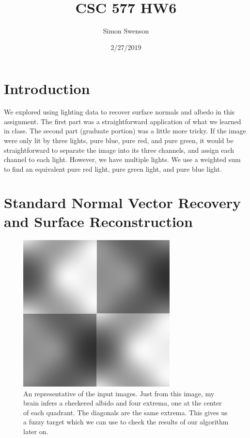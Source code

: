 \documentclass{article}
\title{CSC 577 HW6}
\date{2/27/2019}
\author{Simon Swenson}
\begin{document}
\maketitle
{}

\section{Introduction}

We explored using lighting data to recover surface normals and albedo in this 
assignment. The first part was a straightforward application of what we learned 
in class. The second part (graduate portion) was a little more tricky. If the 
image were only lit by three lights, pure blue, pure red, and pure green, it 
would be straightforward to separate the image into its three channels, and 
assign each channel to each light. However, we have multiple lights. We use a 
weighted sum to find an equivalent pure red light, pure green light, and pure 
blue light.

\section{Standard Normal Vector Recovery and Surface Reconstruction}

\begin{figure}[!ht]
	\centering
	\includegraphics[width=80mm]{figs/4-1.png}
	\caption{An representative of the input images. Just from this image, my 
        brain infers a checkered albido and four extrema, one at the center of 
        each quadrant. The diagonals are the same extrema. This gives us a 
        fuzzy target which we can use to check the results of our algorithm 
        later on.}
\end{figure}
\end{document}
